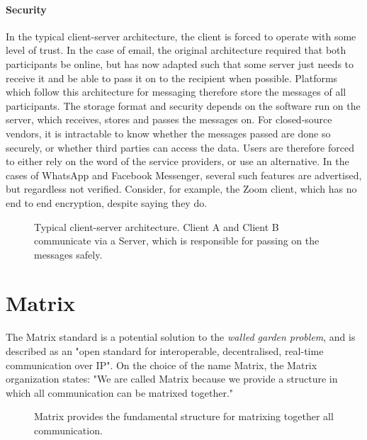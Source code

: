 \paragraph{Security}
In the typical client-server architecture, the client is forced to operate with some level of trust.
In the case of email, the original architecture required that both participants be online, but has now adapted such that some server just needs to receive it and be able to pass it on to the recipient when possible\cite{tomlinson2009first}.
Platforms which follow this architecture for messaging therefore store the messages of all participants.
The storage format and security depends on the software run on the server, which receives, stores and passes the messages on.
For closed-source vendors, it is intractable to know whether the messages passed are done so securely, or whether third parties can access the data.
Users are therefore forced to either rely on the word of the service providers, or use an alternative.
In the cases of WhatsApp and Facebook Messenger, several such features are advertised, but regardless not verified\cite{twitter_comms_protocol_comparison}.
Consider, for example, the Zoom client, which has no end to end encryption, despite saying they do\cite{zoom_e2ee_or_not}.

\begin{figure}
    \centering
    \resizebox{0.6\linewidth}{!}{}
    \caption{
        Typical client-server architecture.
        Client A and Client B communicate via a Server, which is responsible for passing on the messages safely.
    }
    \label{fig:client_server}
\end{figure}

\section{Matrix}
The Matrix standard is a potential solution to the \textit{walled garden problem}, and is described as an "open standard for interoperable, decentralised, real-time communication over IP"\cite{matrix_org}.
On the choice of the name Matrix, the Matrix organization states: "We are called Matrix because we provide a structure in which all communication can be matrixed together."\cite{matrix_org_faq}

\begin{figure}[]
    \centering
    \caption{Matrix provides the fundamental structure for matrixing together all communication.}
    \label{fig:matrixing_together}
\end{figure}


